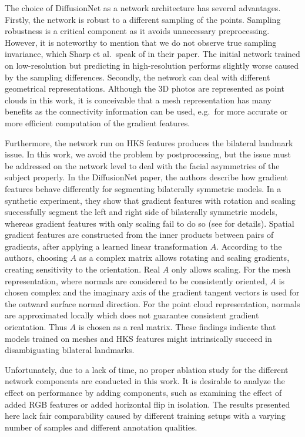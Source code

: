 \documentclass[class=article, crop=false]{standalone}
\begin{document}
The choice of DiffusionNet as a network architecture has several advantages. Firstly, the network is robust to a different sampling of the points. Sampling robustness is a critical component as it avoids unnecessary preprocessing. However, it is noteworthy to mention that we do not observe true sampling invariance, which Sharp et al.\ speak of in their paper. The initial network trained on low-resolution but predicting in high-resolution performs slightly worse caused by the sampling differences. Secondly, the network can deal with different geometrical representations. Although the 3D photos are represented as point clouds in this work, it is conceivable that a mesh representation has many benefits as the connectivity information can be used, e.g.\ for more accurate or more efficient computation of the gradient features.

Furthermore, the network run on HKS features produces the bilateral landmark issue. In this work, we avoid the problem by postprocessing, but the issue must be addressed on the network level to deal with the facial asymmetries of the subject properly. In the DiffusionNet paper, the authors describe how gradient features behave differently for segmenting bilaterally symmetric models. In a synthetic experiment, they show that gradient features with rotation and scaling successfully segment the left and right side of bilaterally symmetric models, whereas gradient features with only scaling fail to do so (see \cite[Section 3.4]{sharp2022diffusion} for details). Spatial gradient features are constructed from the inner products between pairs of gradients, after applying a learned linear transformation $A$. According to the authors, choosing $A$ as a complex matrix allows rotating and scaling gradients, creating sensitivity to the orientation. Real $A$ only allows scaling. For the mesh representation, where normals are considered to be consistently oriented, $A$ is chosen complex and the imaginary axis of the gradient tangent vectors is used for the outward surface normal direction. For the point cloud representation, normals are approximated locally which does not guarantee consistent gradient orientation. Thus $A$ is chosen as a real matrix. These findings indicate that models trained on meshes and HKS features might intrinsically succeed in disambiguating bilateral landmarks.

Unfortunately, due to a lack of time, no proper ablation study for the different network components are conducted in this work. It is desirable to analyze the effect on performance by adding components, such as examining the effect of added RGB features or added horizontal flip in isolation. The results presented here lack fair comparability caused by different training setups with a varying number of samples and different annotation qualities.
\end{document}
